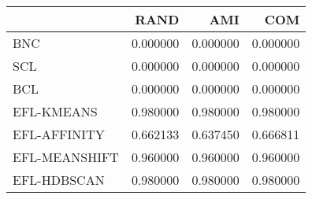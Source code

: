 \begin{tabular}{lrrr}
\toprule
 & RAND & AMI & COM \\
\midrule
BNC & 0.000000 & 0.000000 & 0.000000 \\
SCL & 0.000000 & 0.000000 & 0.000000 \\
BCL & 0.000000 & 0.000000 & 0.000000 \\
EFL-KMEANS & 0.980000 & 0.980000 & 0.980000 \\
EFL-AFFINITY & 0.662133 & 0.637450 & 0.666811 \\
EFL-MEANSHIFT & 0.960000 & 0.960000 & 0.960000 \\
EFL-HDBSCAN & 0.980000 & 0.980000 & 0.980000 \\
\bottomrule
\end{tabular}
